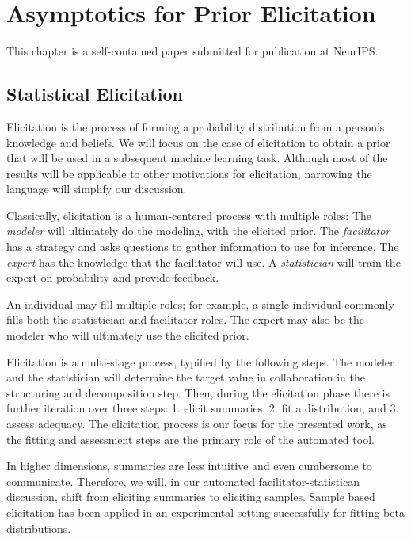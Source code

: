\chapter{Asymptotics for Prior Elicitation}

This chapter is a self-contained paper submitted for publication at NeurIPS.

\section{Statistical Elicitation}

Elicitation is the process of forming a probability distribution from a person's knowledge and beliefs. 
We will focus on the case of elicitation to obtain a prior that will be used in a subsequent machine learning task. Although most of the results will be applicable to other motivations for elicitation, narrowing the language will simplify our discussion. %

Classically, elicitation is a human-centered process with multiple roles:
The \emph{modeler} will ultimately do the modeling, with the elicited prior. 
The \emph{facilitator} has a strategy and asks questions to gather information to use for inference.  
The \emph{expert} has the knowledge that the facilitator will use. 
A \emph{statistician} will train the expert on probability and provide feedback. 

An individual may fill multiple roles; for example, a single individual commonly fills both the statistician and facilitator roles.  
The expert may also be the modeler who will ultimately use the elicited prior.

Elicitation is a multi-stage process, typified by the following steps.  The modeler and the statistician will determine the target value in collaboration in the structuring and decomposition step. Then, during the elicitation phase there is further iteration over three steps: 1. elicit summaries, 2. fit a distribution, and 3. assess adequacy. 
The elicitation process is our focus for the presented work, as the fitting and assessment steps are the primary role of the automated tool. 

In higher dimensions, summaries are less intuitive and even cumbersome to communicate.  Therefore, we will, in our automated facilitator-statistican discussion, shift from eliciting summaries to eliciting samples. 
Sample based elicitation has been applied in an experimental setting successfully for fitting beta distributions.

